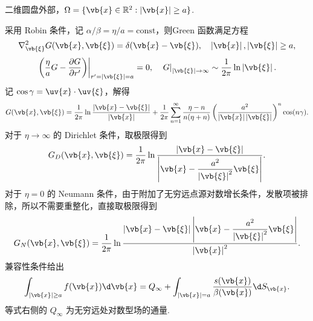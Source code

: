 \begin{example}
	二维圆盘外部，\(\Omega=\{\vb{x}\in\mathbb{R}^2:\left|\vb{x}\right|\geq a\}\).
	
	采用 Robin 条件，记 \(\alpha/\beta=\eta/a=\mathrm{const}\)，则Green 函数满足方程
	\begin{equation*}
		\nabla_{\vb{\xi}}^2G(\vb{x},\vb{\xi})=\delta(\vb{x}-\vb{\xi}),\quad
		\left|\vb{x}\right|,\left|\vb{\xi}\right|\geq a,
	\end{equation*}
	\begin{equation*}
		\left.\left(\frac{\eta}{a}G-\frac{\partial G}{\partial r'}\right)\right|_{r'=\left|\vb{\xi}\right|=a}=0,
		\quad
		\left.G\right|_{\left|\vb{\xi}\right|\to\infty}\sim\frac{1}{2\pi}\ln\left|\vb{\xi}\right|.
	\end{equation*}
	记 \(\cos\gamma=\uv{x}\cdot\uv{\xi}\)，解得
	\begin{equation*}
		G(\vb{x},\vb{\xi})
		=\frac{1}{2\pi}\ln\frac{\left|\vb{x}-\vb{\xi}\right|}{\left|\vb{x}\right|}
		+\frac{1}{2\pi}\sum_{n=1}^\infty\frac{\eta-n}{n(\eta+n)}\left(\frac{a^2}{\left|\vb{x}\right|\left|\vb{\xi}\right|}\right)^n\cos(n\gamma).
	\end{equation*}
	对于 \(\eta\to\infty\) 的 Dirichlet 条件，取极限得到
	\begin{equation*}
		G_D(\vb{x},\vb{\xi})
		=\frac{1}{2\pi}\ln\frac{\left|\vb{x}-\vb{\xi}\right|}{\left|\vb{x}-\dfrac{a^2}{\left|\vb{\xi}\right|^2}\vb{\xi}\right|}.
	\end{equation*}
	对于 \(\eta=0\) 的 Neumann 条件，由于附加了无穷远点源对数增长条件，发散项被排除，所以不需要重整化，直接取极限得到
	\begin{equation*}
		G_N(\vb{x},\vb{\xi})
		=\frac{1}{2\pi}\ln\frac{\left|\vb{x}-\vb{\xi}\right|\left|\vb{x}-\dfrac{a^2}{\left|\vb{\xi}\right|^2}\vb{\xi}\right|}{\left|\vb{x}\right|^2}.
	\end{equation*}
	兼容性条件给出
	\begin{equation*}
		\int_{\left|\vb{x}\right|\geq a}f(\vb{x})\d\vb{x}
		=Q_\infty+\int_{\left|\vb{x}\right|=a}\frac{s(\vb{x})}{\beta(\vb{x})}\d S_{\vb{x}}.
	\end{equation*}
	等式右侧的 \(Q_\infty\) 为无穷远处对数型场的通量.
\end{example}

